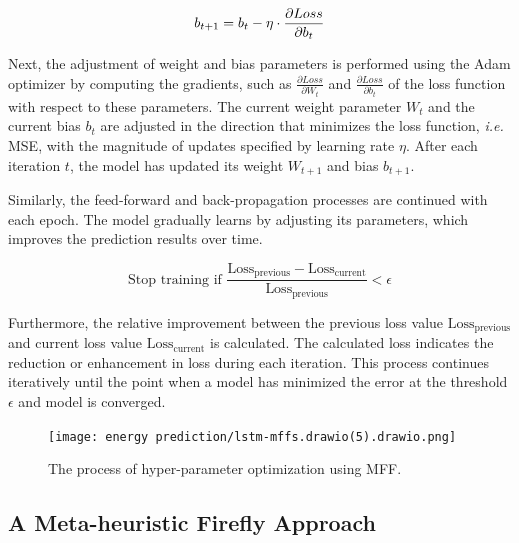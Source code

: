 \documentclass[journal]{IEEEtran}
\begin{document}
\begin{equation} \label{bais update}
\normalsize
    b_{t+1} = b_t - \eta \cdot \frac{\partial Loss}{\partial b_t}
\end{equation}



Next, the adjustment of weight and bias parameters is performed using the Adam optimizer by computing the gradients, such as $\frac{\partial Loss}{\partial W_t}$ and $\frac{\partial Loss}{\partial b_t}$ of the loss function with respect to these parameters. The current weight parameter $W_t$ and the current bias $b_t$ are adjusted in the direction that minimizes the loss function, \textit{i.e.} MSE, with the magnitude of updates specified by learning rate $\eta$. After each iteration $t$, the model has updated its weight  $W_{t+1}$  and bias $b_{t+1}$.

Similarly, the feed-forward and back-propagation processes are continued with each epoch. The model gradually learns by adjusting its parameters, which improves the prediction results over time. 


\begin{equation}\label{convergence}
\text{Stop training if } \frac{\text{Loss}_{\text{previous}} - \text{Loss}_{\text{current}}}{\text{Loss}_{\text{previous}}} < \epsilon
\end{equation}

Furthermore, the relative improvement between the previous loss value ${\text{Loss}_{\text{previous}}}$ and current loss value ${\text{Loss}_{\text{current}}}$ is calculated. The calculated loss indicates the reduction or enhancement in loss during each iteration. This process continues iteratively until the point when a model has minimized the error at the threshold $\epsilon$ and model is converged.







 

\begin{figure}[!h]
    \centering
    \texttt{[image: energy prediction/lstm-mffs.drawio(5).drawio.png]}
    \caption{The process of hyper-parameter optimization using MFF.}
    \label{fig:A deep Learning Framework using LSTM and Modified Firefly}
\end{figure}



\subsection{A Meta-heuristic Firefly Approach}
\end{document}
